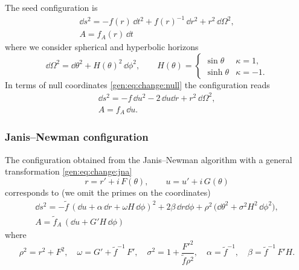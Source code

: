 The seed configuration is
\begin{subequations}
\label{deriv:eq:static:tr}
\begin{gather}
	\label{deriv:eq:static:metric:tr}
	\dd s^2 = - f(r)\, \dd t^2 + f(r)^{-1}\, \dd r^2 + r^2\, \dd\Omega^2, \\
	\label{deriv:eq:static:vector:tr}
	A = f_A(r)\, \dd t
\end{gather}
\end{subequations}
where we consider spherical and hyperbolic horizons
\begin{equation}
	\dd \Omega^2 = \dd\theta^2 + H(\theta)^2\, \dd \phi^2, \qquad
	H(\theta) =
	\begin{cases}
		\sin \theta & \kappa = 1, \\
		\sinh \theta & \kappa = -1.
	\end{cases}
\end{equation} 
In terms of null coordinates \eqref{gen:eq:change:null} the configuration reads
\begin{subequations}
\label{deriv:eq:static:ur}
\begin{gather}
	\label{deriv:eq:static:metric:ur}
	\dd s^2 = - f\, \dd u^2 - 2\, \dd u \dd r + r^2\, \dd\Omega^2, \\
	\label{deriv:eq:static:vector:ur}
	A = f_A\, \dd u.
\end{gather}
\end{subequations}


\subsubsection{Janis--Newman configuration}


The configuration obtained from the Janis--Newman algorithm with a general transformation \eqref{gen:eq:change:jna}
\begin{equation}
	r = r' + i\, F(\theta), \qquad
	u = u' + i\, G(\theta)
\end{equation}
corresponds to (we omit the primes on the coordinates)
\begin{subequations}
\label{deriv:eq:rotating:ur}
\begin{gather}
	\dd s^2 = - \tilde f\, (\dd u + \alpha\, \dd r + \omega H\, \dd\phi )^2
		+ 2 \beta\, \dd r \dd \phi
		+ \rho^2\, \big(\dd\theta^2 + \sigma^2 H^2\, \dd\phi^2 \big), \\
	A = \tilde f_A\, (\dd u + G' H\, \dd \phi)
\end{gather}
\end{subequations}
where
\begin{equation}
	\rho^2 = r^2 + F^2, \quad
	\omega = G' + \tilde f^{-1}\, F', \quad
	\sigma^2 = 1 + \frac{F'^2}{\tilde f \rho^2}, \quad
	\alpha = \tilde f^{-1}, \quad
	\beta = \tilde f^{-1}\, F' H.
\end{equation} 

